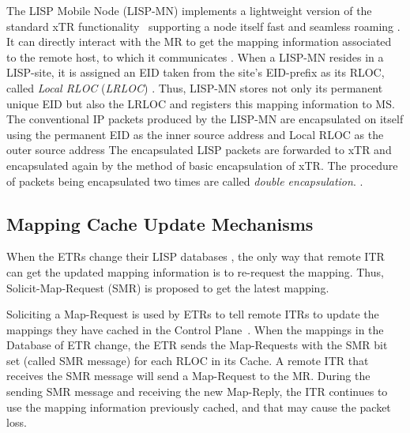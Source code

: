 The LISP Mobile Node (LISP-MN) implements a lightweight version of the standard xTR
functionality~\cite{mn14} supporting a node itself fast and seamless roaming%
. It can directly interact
with the MR to get the mapping information associated to the remote host, to which it communicates .
When a LISP-MN resides in a LISP-site, it is assigned an EID taken from the
site's EID-prefix as its RLOC, called \emph{Local RLOC} (\emph{LRLOC}) .
Thus, LISP-MN stores not only its permanent unique EID but also the LRLOC
and registers this mapping information to MS. The conventional IP packets
produced by the LISP-MN are encapsulated on itself using the permanent EID as
the inner source address and Local RLOC as the outer source address 
The encapsulated LISP packets are forwarded to xTR and encapsulated again by the
method of basic encapsulation of xTR. The procedure of packets being
encapsulated two times are called \emph{double encapsulation}.  .

\subsection{Mapping Cache Update Mechanisms}\label{sec:updateMechanisms}

When the ETRs change their LISP databases , the only way that remote ITR can get the updated mapping
information is to re-request the mapping. Thus, Solicit-Map-Request (SMR) is
proposed to get the latest mapping.  

Soliciting a Map-Request is used by ETRs to tell remote ITRs to update the
mappings they have cached in the Control Plane~\cite{rfc6830}. When the mappings
in the Database of ETR change, the ETR sends the Map-Requests with the SMR bit
set (called SMR message) for each RLOC in its Cache. A remote ITR that receives
the SMR message will send a Map-Request to the MR. During the sending SMR
message and receiving the new Map-Reply, the ITR continues to use the mapping
information previously cached, and that may cause the packet loss.

